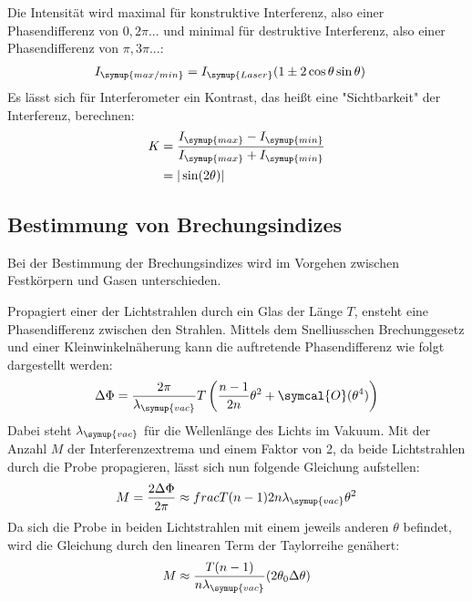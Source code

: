 Die Intensit\"at wird maximal f\"ur konstruktive Interferenz, also einer Phasendifferenz von $0,2\pi...$ und minimal f\"ur destruktive Interferenz, also einer
Phasendifferenz von $\pi,3\pi...$:
\begin{align}
    I_{\symup{max/min}} &= I_{\symup{Laser}}(1\pm 2\cos\theta\sin\theta)
\end{align}
Es l\"asst sich f\"ur Interferometer ein Kontrast, das hei\ss{}t eine "Sichtbarkeit" der Interferenz, berechnen:
\begin{align}
    K &= \frac{I_{\symup{max}} - I_{\symup{min}}}{I_{\symup{max}} + I_{\symup{min}}}\\
      &= |\sin(2\theta)|
    \label{eq:kontrast}
\end{align}

\subsection{Bestimmung von Brechungsindizes}

Bei der Bestimmung der Brechungsindizes wird im Vorgehen zwischen Festk\"orpern und Gasen unterschieden.

Propagiert einer der Lichtstrahlen durch ein Glas der L\"ange $T$, ensteht eine Phasendifferenz zwischen den Strahlen.
Mittels dem Snelliusschen Brechunggesetz und einer Kleinwinkeln\"aherung kann die auftretende Phasendifferenz  wie
folgt dargestellt werden:
\begin{align}
    \Delta \Phi = \frac{2\pi}{\lambda_{\symup{vac}}}T\left(\frac{n-1}{2n}\theta^2+\symcal{O}(\theta^4)\right)
\end{align}
Dabei steht $\lambda_{\symup{vac}}$ f\"ur die Wellenl\"ange des Lichts im Vakuum. Mit der Anzahl $M$ der Interferenzextrema und einem Faktor von 2, da beide Lichtstrahlen durch die Probe propagieren,
l\"asst sich nun folgende Gleichung aufstellen:
\begin{align}
    M = \frac{2\Delta\Phi}{2\pi} \approx frac{T(n-1)}{2n\lambda_{\symup{vac}}}\theta^2
\end{align}
Da sich die Probe in beiden Lichtstrahlen mit einem jeweils anderen $\theta$ befindet, wird die Gleichung durch den linearen Term der Taylorreihe gen\"ahert:
\begin{align}
    M \approx \frac{T(n-1)}{n\lambda_{\symup{vac}}}(2\theta_0\Delta\theta)
\end{align}

